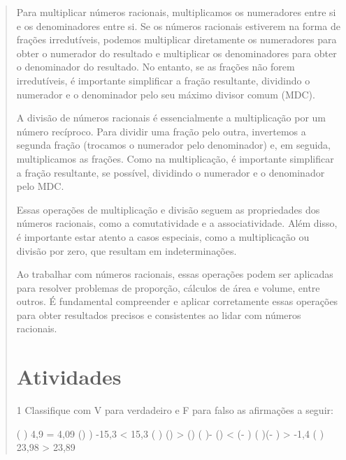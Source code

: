 \begin{quote}
{Para multiplicar números racionais, multiplicamos os numeradores entre si e os denominadores entre si. Se os 
números racionais estiverem na forma de frações irredutíveis, podemos multiplicar diretamente os numeradores 
para obter o numerador do resultado e multiplicar os denominadores para obter o denominador do resultado. No 
entanto, se as frações não forem irredutíveis, é importante simplificar a fração resultante, dividindo o 
numerador e o denominador pelo seu máximo divisor comum (MDC).

A divisão de números racionais é essencialmente a multiplicação por um número recíproco. Para dividir uma 
fração pelo outra, invertemos a segunda fração (trocamos o numerador pelo denominador) e, em seguida, 
multiplicamos as frações. Como na multiplicação, é importante simplificar a fração resultante, se possível, 
dividindo o numerador e o denominador pelo MDC.

Essas operações de multiplicação e divisão seguem as propriedades dos números racionais, como a 
comutatividade e a associatividade. Além disso, é importante estar atento a casos especiais, como a 
multiplicação ou divisão por zero, que resultam em indeterminações.

Ao trabalhar com números racionais, essas operações podem ser aplicadas para resolver problemas de proporção, 
cálculos de área e volume, entre outros. É fundamental compreender e aplicar corretamente essas operações 
para obter resultados precisos e consistentes ao lidar com números racionais.}

\section{Atividades}

\num{1} Classifique com V para verdadeiro e F para falso as afirmações a
seguir:

\begin{boxlist}
\boxitem ( ) 4,9 = 4,09 
\boxitem () ) -15,3 \textless{} 15,3 
\boxitem ( ) () \textgreater{} () 
\boxitem ( )- () \textless{} (- ) 
\boxitem ( )(- ) \textgreater{} -1,4 \hfill
{}
\boxitem ( ) 23,98 \textgreater{} 23,89 
\end{boxlist}


\end{quote}
